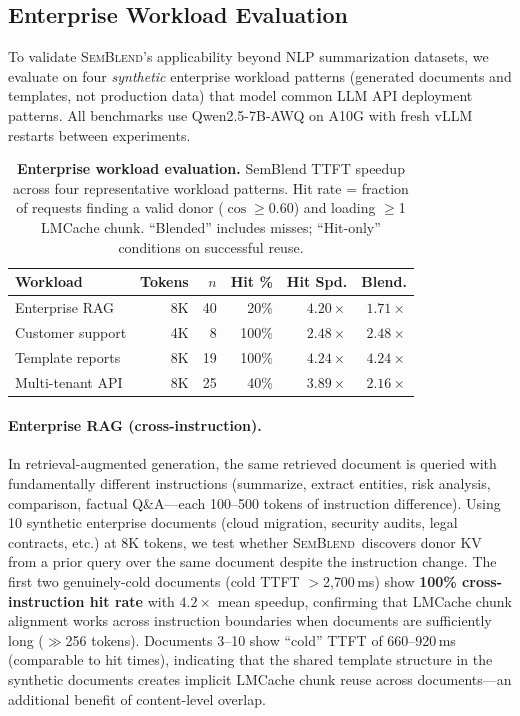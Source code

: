 \documentclass[10pt,twocolumn]{article}
\newcommand{\semblend}{\textsc{SemBlend}\xspace}
\begin{document}
\subsection{Enterprise Workload Evaluation}
\label{sec:enterprise}

To validate \semblend's applicability beyond NLP summarization datasets,
we evaluate on four \emph{synthetic} enterprise workload patterns
(generated documents and templates, not production data) that model
common LLM API deployment patterns. All benchmarks use Qwen2.5-7B-AWQ
on A10G with fresh vLLM restarts between experiments.

\begin{table}[ht]
\centering
\caption{\textbf{Enterprise workload evaluation.} SemBlend TTFT speedup
across four representative workload patterns.
Hit rate = fraction of requests finding a valid donor ($\cos \geq 0.60$)
and loading $\geq$1 LMCache chunk.
``Blended'' includes misses; ``Hit-only'' conditions on successful reuse.}
\label{tab:enterprise}
\footnotesize
\setlength{\tabcolsep}{4pt}
\begin{tabular}{@{}lrrrrr@{}}
\toprule
\textbf{Workload} & \textbf{Tokens} & \textbf{$n$} & \textbf{Hit \%} & \textbf{Hit Spd.} & \textbf{Blend.} \\
\midrule
Enterprise RAG         & 8K   & 40  & 20\%  & $4.20\times$ & $1.71\times$ \\
Customer support       & 4K   & 8   & 100\% & $2.48\times$ & $2.48\times$ \\
Template reports       & 8K   & 19  & 100\% & $4.24\times$ & $4.24\times$ \\
Multi-tenant API       & 8K   & 25  & 40\%  & $3.89\times$ & $2.16\times$ \\
\bottomrule
\end{tabular}
\end{table}

\paragraph{Enterprise RAG (cross-instruction).}
In retrieval-augmented generation, the same retrieved document is queried
with fundamentally different instructions (summarize, extract entities,
risk analysis, comparison, factual Q\&A---each 100--500 tokens of instruction
difference). Using 10 synthetic enterprise documents (cloud migration,
security audits, legal contracts, etc.) at 8K tokens, we test whether
\semblend\ discovers donor KV from a prior query over the same document
despite the instruction change.
The first two genuinely-cold documents (cold TTFT $>$2{,}700\,ms) show
\textbf{100\% cross-instruction hit rate} with $4.2\times$ mean speedup,
confirming that LMCache chunk alignment works across instruction boundaries
when documents are sufficiently long ($\gg$256 tokens).
Documents 3--10 show ``cold'' TTFT of 660--920\,ms (comparable to hit times),
indicating that the shared template structure in the synthetic documents
creates implicit LMCache chunk reuse across documents---an additional
benefit of content-level overlap.
\end{document}
